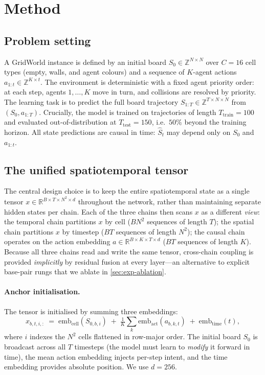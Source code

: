 \section{Method}
\label{sec:method}

\subsection{Problem setting}
\label{sec:problem}

A GridWorld instance is defined by an initial board $S_0 \in
\mathbb{Z}^{N\times N}$ over $C=16$ cell types (empty, walls, and agent colours)
and a sequence of $K$-agent actions $a_{1:t} \in \mathbb{Z}^{K\times t}$. The
environment is deterministic with a fixed agent priority order: at each step,
agents $1,\dots,K$ move in turn, and collisions are resolved by priority. The
learning task is to predict the full board trajectory
$S_{1:T} \in \mathbb{Z}^{T\times N\times N}$ from $(S_0, a_{1:T})$. Crucially,
the model is trained on trajectories of length $T_{\text{train}}{=}100$ and
evaluated out-of-distribution at $T_{\text{test}}{=}150$, i.e.\ $50\%$ beyond
the training horizon. All state predictions are causal in time:
$\hat{S}_t$ may depend only on $S_0$ and $a_{1:t}$.

\subsection{The unified spatiotemporal tensor}
\label{sec:tensor}

The central design choice is to keep the entire spatiotemporal state as a
single tensor $x\in\mathbb{R}^{B\times T\times N^{2}\times d}$ throughout the
network, rather than maintaining separate hidden states per chain. Each of the
three chains then scans $x$ as a different \emph{view}: the temporal chain
partitions $x$ by cell ($B N^2$ sequences of length $T$); the spatial chain
partitions $x$ by timestep ($B T$ sequences of length $N^2$); the causal chain
operates on the action embedding $a \in \mathbb{R}^{B\times K\times T\times d}$
($B T$ sequences of length $K$). Because all three chains read and write the
same tensor, cross-chain coupling is provided \emph{implicitly} by residual
fusion at every layer---an alternative to explicit base-pair rungs that we
ablate in \cref{sec:exp-ablation}.

\paragraph{Anchor initialisation.}
The tensor is initialised by summing three embeddings:
\begin{equation}
x_{b,t,i,:} \;=\; \mathrm{emb}_{\text{cell}}(S_{0,b,i})
               \;+\; \tfrac{1}{K}\textstyle\sum_{k} \mathrm{emb}_{\text{act}}(a_{b,k,t})
               \;+\; \mathrm{emb}_{\text{time}}(t),
\label{eq:anchor}
\end{equation}
where $i$ indexes the $N^2$ cells flattened in row-major order. The initial
board $S_0$ is broadcast across all $T$ timesteps (the model must learn to
\emph{modify} it forward in time), the mean action embedding injects
per-step intent, and the time embedding provides absolute position. We use
$d=256$.

